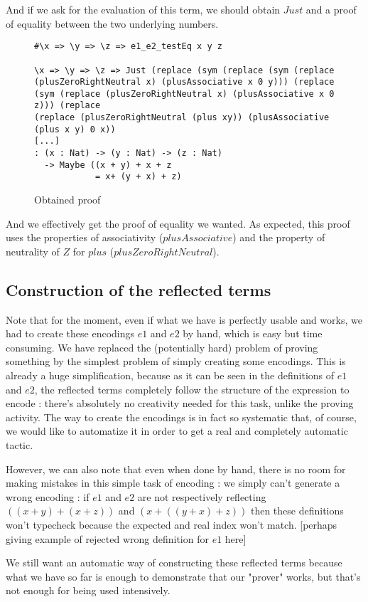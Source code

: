 And if we ask for the evaluation of this term, we should obtain $Just$ and a proof of equality between the two underlying numbers.

\begin{figure}[H]
\figrule
\begin{center}
\begin{verbatim}
#\x => \y => \z => e1_e2_testEq x y z

\x => \y => \z => Just (replace (sym (replace (sym (replace 
(plusZeroRightNeutral x) (plusAssociative x 0 y))) (replace 
(sym (replace (plusZeroRightNeutral x) (plusAssociative x 0 z))) (replace 
(replace (plusZeroRightNeutral (plus xy)) (plusAssociative (plus x y) 0 x)) 
[...]
: (x : Nat) -> (y : Nat) -> (z : Nat) 
  -> Maybe ((x + y) + x + z 
            = x+ (y + x) + z)
\end{verbatim}
\end{center}
\caption{Obtained proof}
\figrule
\end{figure}

And we effectively get the proof of equality we wanted. As expected, this proof uses the properties of associativity ($plusAssociative$) and the property of neutrality of $Z$ for $plus$ ($plusZeroRightNeutral$).


\subsection{Construction of the reflected terms}

Note that for the moment, even if what we have is perfectly usable and works, we had to create these encodings $e1$ and $e2$ by hand, which is easy but time consuming. We have replaced the (potentially hard) problem of proving something by the simplest problem of simply creating some encodings. This is already a huge simplification, because as it can be seen in the definitions of $e1$ and $e2$, the reflected terms completely follow the structure of the expression to encode : there's absolutely no creativity needed for this task, unlike the proving activity. The way to create the encodings is in fact so systematic that, of course, we would like to automatize it in order to get a real and completely automatic tactic.

However, we can also note that even when done by hand, there is no room for making mistakes in this simple task of encoding : we simply can't generate a wrong encoding : if $e1$ and $e2$ are not respectively reflecting $((x+y) + (x+z))$ and $(x + ((y + x) + z))$ then these definitions won't typecheck because the expected and real index won't match. [perhaps giving example of rejected wrong definition for $e1$ here]

We still want an automatic way of constructing these reflected terms because what we have so far is enough to demonstrate that our "prover" works, but that's not enough for being used intensively. 


